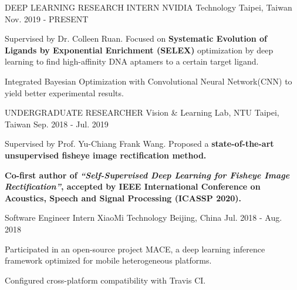 

\begin{cventries}

\cventry
    {DEEP LEARNING RESEARCH INTERN} %
    {NVIDIA Technology} %
    {Taipei, Taiwan} %
    {Nov. 2019 - PRESENT} %
    {
      \begin{cvitems} %
        \item {Supervised by Dr. Colleen Ruan. Focused on \textbf{Systematic Evolution of Ligands by Exponential Enrichment (SELEX)} optimization by deep learning to find high-affinity DNA aptamers to a certain target ligand.}
        \item {Integrated Bayesian Optimization with Convolutional Neural Network(CNN) to yield better experimental results.}
      \end{cvitems}
    }

\cventry
    {UNDERGRADUATE RESEARCHER} %
    {Vision \& Learning Lab, NTU} %
    {Taipei, Taiwan} %
    {Sep. 2018 - Jul. 2019} %
    {
      \begin{cvitems} %
        \item {Supervised by Prof. Yu-Chiang Frank Wang. Proposed a \textbf{state-of-the-art unsupervised fisheye image rectification method.}}
        \item {\textbf{Co-first author of \textit{“Self-Supervised Deep Learning for Fisheye Image Rectification”}, accepted by IEEE International Conference on Acoustics, Speech and Signal Processing (ICASSP 2020).}}
      \end{cvitems}
    }



  \cventry
    {Software Engineer Intern} %
    {XiaoMi Technology} %
    {Beijing, China} %
    {Jul. 2018 - Aug. 2018} %
    {
      \begin{cvitems} %
        \item {Participated in an open-source project MACE, a deep learning inference framework optimized for mobile heterogeneous platforms.}
        \item {Configured cross-platform compatibility with Travis CI.}
      \end{cvitems}
    }

\end{cventries}
